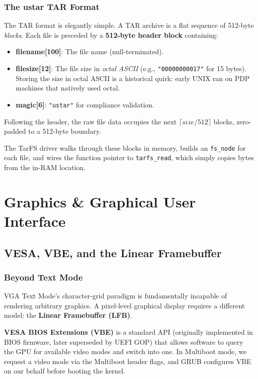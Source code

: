 \documentclass[12pt,a4paper]{report}
\begin{document}
\subsection{The ustar TAR Format}

The TAR format is elegantly simple. A TAR archive is a flat sequence of 512-byte
\textit{blocks}. Each file is preceded by a \textbf{512-byte header block} containing:
\begin{itemize}
    \item \textbf{filename[100]}: The file name (null-terminated).
    \item \textbf{filesize[12]}: The file size in \textit{octal ASCII} (e.g.,
    \texttt{"00000000017"} for 15 bytes). Storing the size in octal ASCII is a
    historical quirk: early UNIX ran on PDP machines that natively used octal.
    \item \textbf{magic[6]}: \texttt{"ustar"} for compliance validation.
\end{itemize}
Following the header, the raw file data occupies the next $\lceil size/512 \rceil$
blocks, zero-padded to a 512-byte boundary.

The TarFS driver walks through these blocks in memory, builds an \texttt{fs\_node}
for each file, and wires the function pointer to \texttt{tarfs\_read}, which simply
copies bytes from the in-RAM location.

\newpage

\chapter{Graphics \& Graphical User Interface}

\section{VESA, VBE, and the Linear Framebuffer}

\subsection{Beyond Text Mode}

VGA Text Mode's character-grid paradigm is fundamentally incapable of rendering
arbitrary graphics. A pixel-level graphical display requires a different model:
the \textbf{Linear Framebuffer (LFB)}.

\textbf{VESA BIOS Extensions (VBE)} is a standard API (originally implemented in
BIOS firmware, later superseded by UEFI GOP) that allows software to query the
GPU for available video modes and switch into one. In Multiboot mode, we request a
video mode via the Multiboot header flags, and GRUB configures VBE on our behalf
before booting the kernel.
\end{document}
